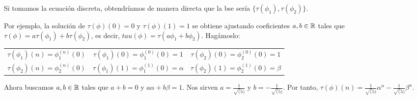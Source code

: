 \begin{ejemplo}
  Si tomamos la ecuación discreta, obtendríamos de manera directa que la bse sería
  \(\{\tau(\phi_1), \tau(\phi_2)\}\).

  Por ejemplo, la solución de \(\tau(\phi)(0) = 0\) y \(\tau(\phi)(1) = 1\) se obtiene
  ajustando coeficientes \(a, b \in \mathbb{R}\) tales que \(\tau(\phi) = a\tau(\phi_1) +
  b \tau(\phi_2)\), es decir, \(tau(\phi) = \tau(a\phi_1 + b\phi_2)\). Hagámoslo:
  \begin{center}
    \begin{tabular}{c c c}
      \(\tau(\phi_1)(n) = \phi_1^{(n)}(0)\) & \(\tau(\phi_1)(0) = \phi_1^{(0)}(0) = 1\) & \(\tau(\phi_2)(0) = \phi_2^{(0)}(0) = 1\) \\
      \(\tau(\phi_2)(n) = \phi_2^{(n)}(0)\) & \(\tau(\phi_1)(1) = \phi_1^{(1)}(0) = \alpha\) & \(\tau(\phi_2)(1) = \phi_2^{(1)}(0) = \beta\) \\
    \end{tabular}
  \end{center}

  Ahora buscamos \(a, b \in \mathbb{R}\) tales que \(a + b = 0\) y \(a\alpha + b\beta = 1\).
  Nos sirven \(a = \frac{1}{\sqrt(5)}\) y \(b = -\frac{1}{\sqrt(5)}\).
  Por tanto, \(\tau(\phi)(n) = \frac{1}{\sqrt(5)}\alpha^n - \frac{1}{\sqrt(5)}\beta^n\).
\end{ejemplo}
